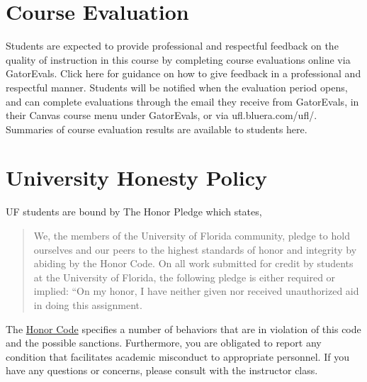 \documentclass[11pt, article, oneside]{memoir}
\begin{document}
\section{Course Evaluation}
Students are expected to provide professional and respectful feedback on the quality of instruction in this course by completing course evaluations online via GatorEvals. Click here for guidance on how to give feedback in a professional and respectful manner. Students will be notified when the evaluation period opens, and can complete evaluations through the email they receive from GatorEvals, in their Canvas course menu under GatorEvals, or via ufl.bluera.com/ufl/. Summaries of course evaluation results are available to students here.


\section{University Honesty Policy}
UF students are bound by The Honor Pledge which states, 
\begin{quote}
    We, the members of the University of Florida community, pledge to hold ourselves and our peers to the highest standards of honor and integrity by abiding by the Honor Code. On all work submitted for credit by students at the University of Florida, the following pledge is either required or implied: “On my honor, I have neither given nor received unauthorized aid in doing this assignment.
\end{quote}

The \href{https://sccr.dso.ufl.edu/policies/student-honor-code-student-conduct- code/}{Honor Code} specifies a number of behaviors that are in violation of this code and the possible sanctions. Furthermore, you are obligated to report any condition that facilitates academic misconduct to appropriate personnel. If you have any questions or concerns, please consult with the instructor class.
\end{document}
